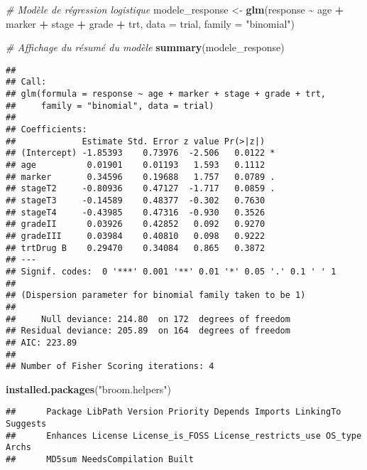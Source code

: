 \documentclass[
]{article}
\newenvironment{Shaded}{\begin{snugshade}}{\end{snugshade}}
\newcommand{\AttributeTok}[1]{\textcolor[rgb]{0.13,0.29,0.53}{#1}}
\newcommand{\CommentTok}[1]{\textcolor[rgb]{0.56,0.35,0.01}{\textit{#1}}}
\newcommand{\FunctionTok}[1]{\textcolor[rgb]{0.13,0.29,0.53}{\textbf{#1}}}
\newcommand{\NormalTok}[1]{#1}
\newcommand{\OtherTok}[1]{\textcolor[rgb]{0.56,0.35,0.01}{#1}}
\newcommand{\SpecialCharTok}[1]{\textcolor[rgb]{0.81,0.36,0.00}{\textbf{#1}}}
\newcommand{\StringTok}[1]{\textcolor[rgb]{0.31,0.60,0.02}{#1}}
\begin{document}
\begin{Shaded}
\begin{Highlighting}[]
\CommentTok{\# Modèle de régression logistique}
\NormalTok{modele\_response }\OtherTok{\textless{}{-}} \FunctionTok{glm}\NormalTok{(response }\SpecialCharTok{\textasciitilde{}}\NormalTok{ age }\SpecialCharTok{+}\NormalTok{ marker }\SpecialCharTok{+}\NormalTok{ stage }\SpecialCharTok{+}\NormalTok{ grade }\SpecialCharTok{+}\NormalTok{ trt, }\AttributeTok{data =}\NormalTok{ trial, }\AttributeTok{family =} \StringTok{"binomial"}\NormalTok{)}

\CommentTok{\# Affichage du résumé du modèle}
\FunctionTok{summary}\NormalTok{(modele\_response)}
\end{Highlighting}
\end{Shaded}

\begin{verbatim}
## 
## Call:
## glm(formula = response ~ age + marker + stage + grade + trt, 
##     family = "binomial", data = trial)
## 
## Coefficients:
##             Estimate Std. Error z value Pr(>|z|)  
## (Intercept) -1.85393    0.73976  -2.506   0.0122 *
## age          0.01901    0.01193   1.593   0.1112  
## marker       0.34596    0.19688   1.757   0.0789 .
## stageT2     -0.80936    0.47127  -1.717   0.0859 .
## stageT3     -0.14589    0.48377  -0.302   0.7630  
## stageT4     -0.43985    0.47316  -0.930   0.3526  
## gradeII      0.03926    0.42852   0.092   0.9270  
## gradeIII     0.03984    0.40810   0.098   0.9222  
## trtDrug B    0.29470    0.34084   0.865   0.3872  
## ---
## Signif. codes:  0 '***' 0.001 '**' 0.01 '*' 0.05 '.' 0.1 ' ' 1
## 
## (Dispersion parameter for binomial family taken to be 1)
## 
##     Null deviance: 214.80  on 172  degrees of freedom
## Residual deviance: 205.89  on 164  degrees of freedom
## AIC: 223.89
## 
## Number of Fisher Scoring iterations: 4
\end{verbatim}

\begin{Shaded}
\begin{Highlighting}[]
\FunctionTok{installed.packages}\NormalTok{(}\StringTok{"broom.helpers"}\NormalTok{)}
\end{Highlighting}
\end{Shaded}

\begin{verbatim}
##      Package LibPath Version Priority Depends Imports LinkingTo Suggests
##      Enhances License License_is_FOSS License_restricts_use OS_type Archs
##      MD5sum NeedsCompilation Built
\end{verbatim}
\end{document}

